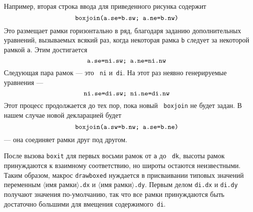 \documentclass{article} %
\newcommand\invisgap{\nobreak\hskip0pt\relax}
\newcommand\tdescr[1]{$\langle$\invisgap#1\invisgap$\rangle$}
\begin{document}
Например, вторая строка ввода для приведенного рисунка содержит 
$$ \hbox{\tt boxjoin(a.se=b.sw; a.ne=b.nw)} $$
Это размещает рамки горизонтально в ряд, благодаря заданию дополнительных 
уравнений, вызываемых всякий раз, когда некоторая рамка {\tt b} следует за 
некоторой рамкой {\tt a}.
Этим достигается
$$ \hbox{\tt a.se=ni.sw; a.ne=ni.nw} $$
Следующая пара рамок --- это ~{\tt ni} и~{\tt di}.
На этот раз неявно генерируемые уравнения --- 
$$ \hbox{\tt ni.se=di.sw; ni.ne=di.nw} $$
Этот процесс продолжается до тех пор, пока новый {\tt
boxjoin} не будет задан.
В нашем случае новой декларацией будет 
$$ \hbox{\tt boxjoin(a.sw=b.nw; a.se=b.ne)} $$
--- она соединяет рамки друг под другом.

После вызова {\tt boxit} для первых восьми рамок от {\tt a} до {\tt
dk}, высоты рамок принуждаются к взаимному соответствию, но широты 
остаются неизвестными.
Таким образом, макрос {\tt drawboxed} 
нуждается в присваивании типовых значений переменным \tdescr{имя рамки}{\tt.dx}
и \tdescr{имя рамки}{\tt.dy}. 
Первым делом {\tt di.dx} и {\tt di.dy} получают значения по-умолчанию, так 
что все рамки принуждаются быть достаточно большими для вмещения 
содержимого~{\tt di}.
\end{document}
